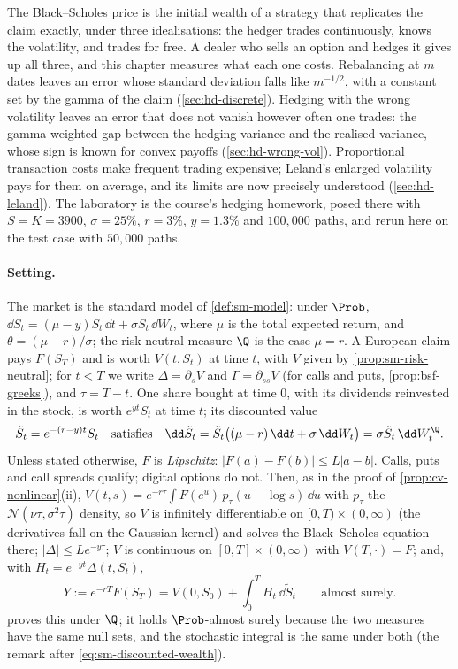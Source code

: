 
The Black--Scholes price is the initial wealth of a strategy that replicates the claim
exactly, under three idealisations: the hedger trades continuously, knows the volatility, and
trades for free. A dealer who sells an option and hedges it gives up all three, and this
chapter measures what each one costs. Rebalancing at $m$ dates leaves an error whose standard
deviation falls like $m^{-1/2}$, with a constant set by the gamma of the claim
(\cref{sec:hd-discrete}). Hedging with the wrong volatility leaves an error that does not
vanish however often one trades: the gamma-weighted gap between the hedging variance and the
realised variance, whose sign is known for convex payoffs (\cref{sec:hd-wrong-vol}).
Proportional transaction costs make frequent trading expensive; Leland's enlarged volatility
pays for them on average, and its limits are now precisely understood
(\cref{sec:hd-leland}). The laboratory is the course's hedging homework, posed there with $S=K=3900$,
$\sigma=25\%$, $r=3\%$, $y=1.3\%$ and $100{,}000$ paths, and rerun here on the test case with $50{,}000$
paths.

\paragraph{Setting.} The market is the standard model of \cref{def:sm-model}: under $\Prob$,
$\dd S_t=(\mu-y)S_t\,\dd t+\sigma S_t\,\dd W_t$, where $\mu$ is the total expected return, and
$\theta=(\mu-r)/\sigma$; the risk-neutral measure $\Q$ is the case $\mu=r$. A European claim
pays $F(S_T)$ and is worth $V(t,S_t)$ at time $t$, with $V$ given by
\cref{prop:sm-risk-neutral}; for $t<T$ we write $\Delta=\partial_sV$ and $\Gamma=\partial_{ss}V$
(for calls and puts, \cref{prop:bsf-greeks}), and $\tau=T-t$. One share bought at time $0$,
with its dividends reinvested in the stock, is worth $e^{yt}S_t$ at time $t$; its discounted
value
\begin{equation}\label{eq:hd-stilde}
  \tilde S_t=e^{-(r-y)t}S_t\quad\text{satisfies}\quad
  \dd\tilde S_t=\tilde S_t\big((\mu-r)\,\dd t+\sigma\,\dd W_t\big)=\sigma\tilde S_t\,\dd W^\Q_t .
\end{equation}
Unless stated otherwise, $F$ is \emph{Lipschitz}: $|F(a)-F(b)|\le L|a-b|$. Calls, puts and
call spreads qualify; digital options do not. Then, as in the proof of
\cref{prop:cv-nonlinear}(ii), $V(t,s)=e^{-r\tau}\int F(e^u)\,p_\tau(u-\log s)\,\dd u$ with
$p_\tau$ the $\mathcal N(\nu\tau,\sigma^2\tau)$ density, so $V$ is infinitely differentiable on
$[0,T)\times(0,\infty)$ (the derivatives fall on the Gaussian kernel) and solves the
Black--Scholes equation there; $|\Delta|\le Le^{-y\tau}$; $V$ is continuous on
$[0,T]\times(0,\infty)$ with $V(T,\cdot)=F$; and, with $H_t=e^{-yt}\Delta(t,S_t)$,
\begin{equation}\label{eq:hd-replication}
  Y:=e^{-rT}F(S_T)=V(0,S_0)+\int_0^TH_t\,\dd\tilde S_t\qquad\text{almost surely.}
\end{equation}
 proves this under $\Q$; it holds $\Prob$-almost surely because the
two measures have the same null sets, and the stochastic integral is the same under both
(the remark after \eqref{eq:sm-discounted-wealth}).

